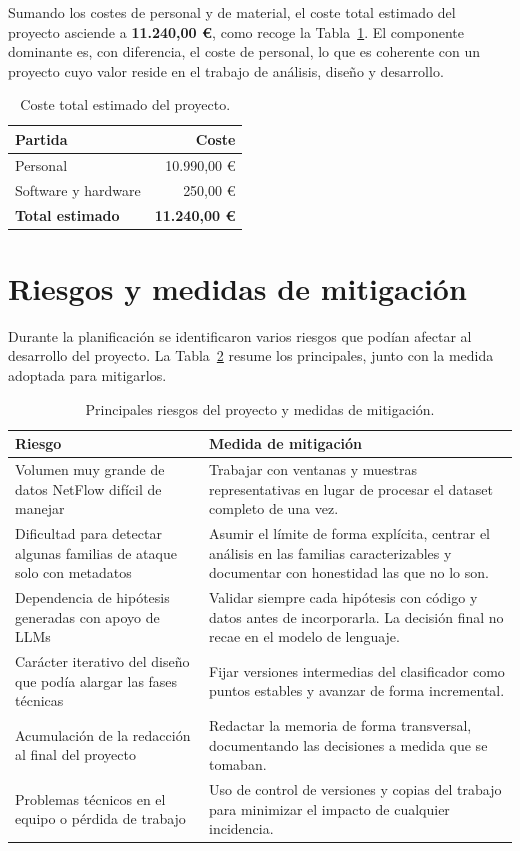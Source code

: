 Sumando los costes de personal y de material, el coste total estimado del proyecto asciende a \textbf{11.240,00 €}, como recoge la Tabla~\ref{tab:coste_total}. El componente dominante es, con diferencia, el coste de personal, lo que es coherente con un proyecto cuyo valor reside en el trabajo de análisis, diseño y desarrollo.

\begin{table}[ht]
\centering
\small
\begin{tabular}{|l|r|}
\hline
\textbf{Partida} & \textbf{Coste} \\
\hline
Personal & 10.990,00 € \\
\hline
Software y hardware & 250,00 € \\
\hline
\textbf{Total estimado} & \textbf{11.240,00 €} \\
\hline
\end{tabular}
\caption{Coste total estimado del proyecto.}
\label{tab:coste_total}
\end{table}

\section{Riesgos y medidas de mitigación}
\label{sec:plan_riesgos}

Durante la planificación se identificaron varios riesgos que podían afectar al desarrollo del proyecto. La Tabla~\ref{tab:riesgos} resume los principales, junto con la medida adoptada para mitigarlos.

\begin{table}[ht]
\centering
\small
\begin{tabular}{|p{4.3cm}|p{8.5cm}|}
\hline
\textbf{Riesgo} & \textbf{Medida de mitigación} \\
\hline
Volumen muy grande de datos NetFlow difícil de manejar & Trabajar con ventanas y muestras representativas en lugar de procesar el dataset completo de una vez. \\
\hline
Dificultad para detectar algunas familias de ataque solo con metadatos & Asumir el límite de forma explícita, centrar el análisis en las familias caracterizables y documentar con honestidad las que no lo son. \\
\hline
Dependencia de hipótesis generadas con apoyo de LLMs & Validar siempre cada hipótesis con código y datos antes de incorporarla. La decisión final no recae en el modelo de lenguaje. \\
\hline
Carácter iterativo del diseño que podía alargar las fases técnicas & Fijar versiones intermedias del clasificador como puntos estables y avanzar de forma incremental. \\
\hline
Acumulación de la redacción al final del proyecto & Redactar la memoria de forma transversal, documentando las decisiones a medida que se tomaban. \\
\hline
Problemas técnicos en el equipo o pérdida de trabajo & Uso de control de versiones y copias del trabajo para minimizar el impacto de cualquier incidencia. \\
\hline
\end{tabular}
\caption{Principales riesgos del proyecto y medidas de mitigación.}
\label{tab:riesgos}
\end{table}

